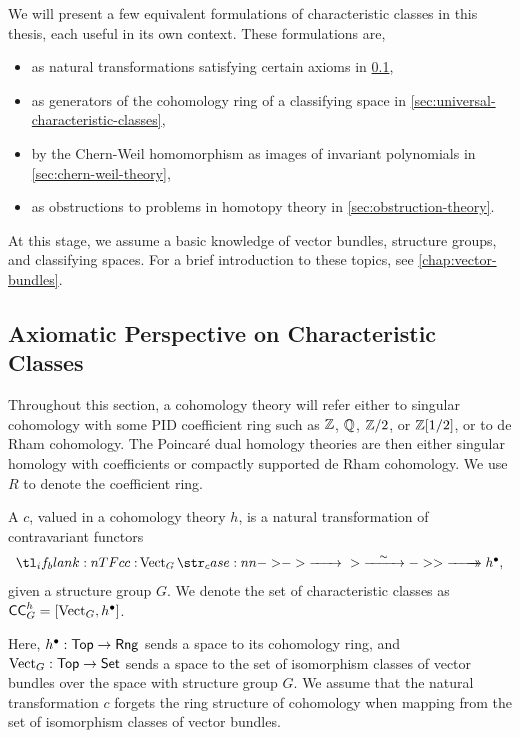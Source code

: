 We will present a few equivalent formulations of characteristic classes in this thesis, each useful in its own context. These formulations are,
\begin{itemize}
	\item as natural transformations satisfying certain axioms in \cref{sec:axiomatic-characteristic-classes},
	\item as generators of the cohomology ring of a classifying space in \cref{sec:universal-characteristic-classes},
	\item by the Chern-Weil homomorphism as images of invariant polynomials in \cref{sec:chern-weil-theory},
	\item as obstructions to problems in homotopy theory in \cref{sec:obstruction-theory}.
\end{itemize}
At this stage, we assume a basic knowledge of vector bundles, structure groups, and classifying spaces. For a brief introduction to these topics, see \cref{chap:vector-bundles}.

\subsection{Axiomatic Perspective on Characteristic Classes}\label{sec:axiomatic-characteristic-classes}

Throughout this section, a cohomology theory will refer either to singular cohomology with some PID coefficient ring such as $\mathbb{Z}$, $\mathbb{Q}$, $\mathbb{Z}/2$, or $\mathbb{Z}[1/2]$, or to de Rham cohomology. The Poincar\'e dual homology theories are then either singular homology with coefficients or compactly supported de Rham cohomology. We use $R$ to denote the coefficient ring.

\begin{definition}\label{defn:characteristic-class}
	A  $c$, valued in a cohomology theory $h$, is a natural transformation of contravariant functors
	\[
		\lkxfunc{c}{\Vect_G}{h^\bullet,}
	\]
	given a structure group $G$. We denote the set of characteristic classes as $\mathsf{CC}_G^h = [\operatorname{Vect}_G , h^\bullet]$.
\end{definition}

Here, $h^\bullet : \mathsf{Top} \to \mathsf{Rng}$ sends a space to its  cohomology ring, and $\operatorname{Vect}_G : \mathsf{Top} \to \mathsf{Set}$ sends a space to the set of isomorphism classes of vector bundles over the space with structure group $G$. We assume that the natural transformation $c$ forgets the ring structure of cohomology when mapping from the set of isomorphism classes of vector bundles.

